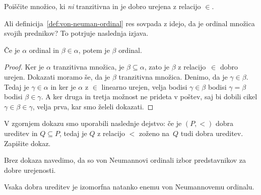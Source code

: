 \begin{vaja}
  Poiščite množico, ki \emph{ni} tranzitivna in je dobro urejena z relacijo $\in$.
\end{vaja}

Ali definicija~\ref{def:von-neuman-ordinal} res sovpada z idejo, da je ordinal množica svojih prednikov? To potrjuje naslednja izjava.

\begin{izjava}
  Če je $\alpha$ ordinal in $\beta \in \alpha$, potem je $\beta$ ordinal.
\end{izjava}

\begin{proof}
  Ker je $\alpha$ tranzitivna množica, je $\beta \subseteq \alpha$, zato je $\beta$ z relacijo~$\in$ dobro urejen. Dokazati moramo še, da je $\beta$ tranzitivna množica. Denimo, da je $\gamma \in \beta$.
  Tedaj je $\gamma \in \alpha$ in ker je $\alpha$ z $\in$ linearno urejen, velja bodisi $\gamma \in \beta$ bodisi $\gamma = \beta$ bodisi $\beta \in \gamma$. A ker druga in tretja možnost ne prideta v poštev, saj bi dobili cikel $\gamma \in \beta \in \gamma$, velja prva, kar smo želeli dokazati.
\end{proof}

\begin{vaja}
  V zgornjem dokazu smo uporabili naslednje dejstvo: če je $(P, {<})$ dobra ureditev in $Q \subseteq P$, tedaj je $Q$ z relacijo $<$ zoženo na~$Q$ tudi dobra ureditev. Zapišite dokaz.
\end{vaja}

Brez dokaza navedimo, da so von Neumannovi ordinali izbor predstavnikov za dobre urejenosti.

\begin{izrek}
  Vsaka dobra ureditev je izomorfna natanko enemu von Neumannovemu ordinalu.
\end{izrek}

